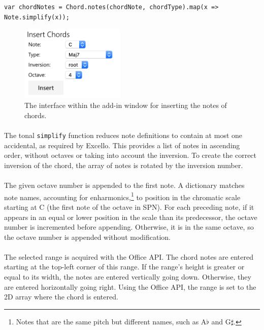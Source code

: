 \begin{verbatim}
var chordNotes = Chord.notes(chordNote, chordType).map(x => Note.simplify(x));
\end{verbatim}
\vspace{-10pt}

\begin{figure}[htb]
\centerline{\includegraphics[width=50mm]{figs/insertChord.png}}
\caption{The interface within the add-in window for inserting the notes of chords.}
\label{fig:chordInput}
\end{figure}

\vspace{-20pt}
\paragraph{} The tonal \texttt{simplify} function reduces note definitions to contain at most one accidental, as required by Excello. This provides a list of notes in ascending order, without octaves or taking into account the inversion. To create the correct inversion of the chord, the array of notes is rotated by the inversion number.

\paragraph{} The given octave number is appended to the first note. A dictionary matches note names, accounting for enharmonics,\footnote{Notes that are the same pitch but different names, such as A$\flat$ and G$\sharp$.} to position in the chromatic scale starting at C (the first note of the octave in SPN). For each preceding note, if it appears in an equal or lower position in the scale than its predecessor, the octave number is incremented before appending. Otherwise, it is in the same octave, so the octave number is appended without modification.

\paragraph{} The selected range is acquired with the Office API. The chord notes are entered starting at the top-left corner of this range. If the range's height is greater or equal to its width, the notes are entered vertically going down. Otherwise, they are entered horizontally going right. Using the Office API, the range is set to the 2D array where the chord is entered.


